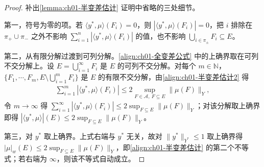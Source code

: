 \documentclass[../../main.tex]{subfiles}%
\begin{document}
\begin{proof}
补出\cref{lemma:ch01-半变差估计} 证明中省略的三处细节。

第一，符号为零的项。若 $\langle y^*,\mu\rangle(F_i)=0$，则 $\left|\langle y^*,\mu\rangle(F_i)\right|=0$，把 $i$ 排除在 $\pi_+\cup\pi_-$ 之外不影响 $\sum_{i=1}^n\left|\langle y^*,\mu\rangle(F_i)\right|$ 的值，也不影响 $\bigcup_{i\in\pi_\pm}F_i\subseteq E$。

第二，从有限分解过渡到可列分解。\eqref{align:ch01-全变差公式} 中的上确界取在可列不交分解上。设 $E=\bigcup_{i=1}^\infty F_i$ 是 $E$ 的可列不交分解。对每个 $m\in\mathbb{N}$，$\{F_1,\cdots ,F_m,E\setminus\bigcup_{i=1}^mF_i\}$ 是 $E$ 的有限不交分解，由\eqref{align:ch01-半变差估计2} 得
\begin{align*}
\sum_{i=1}^m\left|\langle y^*,\mu\rangle(F_i)\right|\leqslant 2\sup_{F\in\mathcal{A},\ F\subseteq E}\|\mu(F)\|_Y,
\end{align*}
令 $m\to\infty$ 得 $\sum_{i=1}^\infty\left|\langle y^*,\mu\rangle(F_i)\right|\leqslant 2\sup_{F\subseteq E}\|\mu(F)\|_Y$；对该分解取上确界即得 $\left|\langle y^*,\mu\rangle\right|(E)\leqslant 2\sup_{F\subseteq E}\|\mu(F)\|_Y$。

第三，对 $y^*$ 取上确界。上式右端与 $y^*$ 无关，故对 $\|y^*\|_{Y^*}\leqslant1$ 取上确界得 $|\mu|_w(E)\leqslant 2\sup_{F\subseteq E}\|\mu(F)\|_Y$，即\eqref{align:ch01-半变差估计} 的第二个不等式；若右端为 $\infty$，则该不等式自动成立。
\end{proof}
\end{document}
